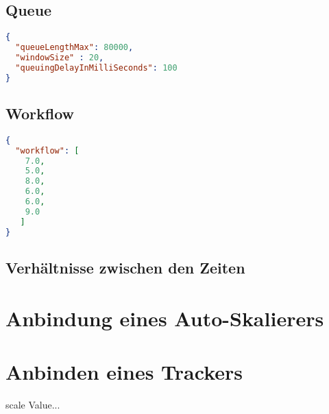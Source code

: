 \subsection{Queue}

\begin{lstlisting}[language=json,firstnumber=1]
{
  "queueLengthMax": 80000,
  "windowSize" : 20,
  "queuingDelayInMilliSeconds": 100
} 
\end{lstlisting}

\subsection{Workflow}

\begin{lstlisting}[language=json,firstnumber=1]
{
  "workflow": [
    7.0,
    5.0,
    8.0,
    6.0,
    6.0,
    9.0 
   ]
}
\end{lstlisting}

\subsection{Verhältnisse zwischen den Zeiten}



\section{Anbindung eines Auto-Skalierers}
\label{sec:Konfiguration:AnbindungScaler}

\section{Anbinden eines Trackers}

scale Value...


